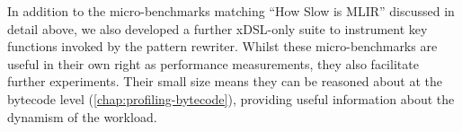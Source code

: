 In addition to the micro-benchmarks matching ``How Slow is MLIR'' discussed in detail above, we also developed a further xDSL-only suite to instrument key functions invoked by the pattern rewriter.
Whilst these micro-benchmarks are useful in their own right as performance measurements, they also facilitate further experiments. Their small size means they can be reasoned about at the bytecode level (\autoref{chap:profiling-bytecode}), providing useful information about the dynamism of the workload.





















